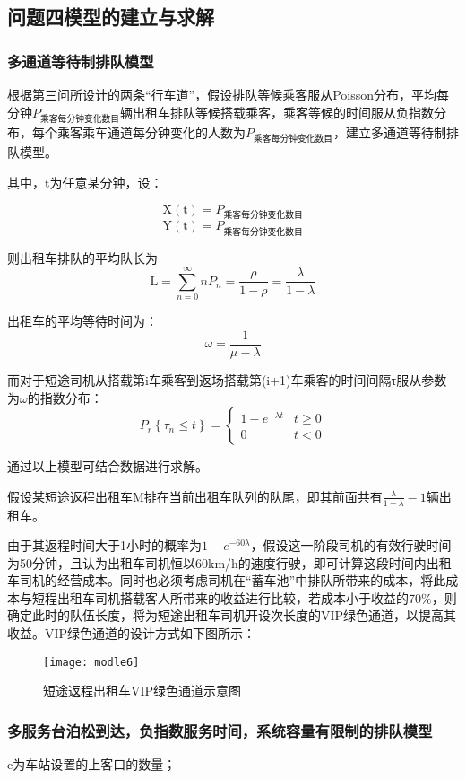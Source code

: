 \documentclass[withoutpreface,bwprint]{cumcmthesis} %
\begin{document}
\subsection{问题四模型的建立与求解}
\subsubsection{多通道等待制排队模型}
根据第三问所设计的两条“行车道”，假设排队等候乘客服从Poisson分布，平均每分钟$P_{\text{乘客每分钟变化数目}}$辆出租车排队等候搭载乘客，乘客等候的时间服从负指数分布，每个乘客乘车通道每分钟变化的人数为$P_{\text{乘客每分钟变化数目}}$，建立多通道等待制排队模型。

其中，t为任意某分钟，设：

$$
\mathrm{X}(\mathrm{t})=P_{\text{乘客每分钟变化数目}}
$$
$$
\mathrm{Y}(\mathrm{t})=P_{\text{乘客每分钟变化数目}}
$$

则出租车排队的平均队长为
$$
\mathrm{L}=\sum_{n=0}^{\infty} n P_{n}=\frac{\rho}{1-\rho}=\frac{\lambda}{1-\lambda}
$$

出租车的平均等待时间为：
$$
\omega=\frac{1}{\mu-\lambda}
$$

而对于短途司机从搭载第i车乘客到返场搭载第(i+1)车乘客的时间间隔τ服从参数为$\omega$的指数分布：
$$
P_{r}\left\{\tau_{n} \leq t\right\}=\left\{\begin{array}{ll}{1-e^{-\lambda t}} & {t \geq 0} \\ {0} & {t<0}\end{array}\right.
$$

通过以上模型可结合数据进行求解。

假设某短途返程出租车M排在当前出租车队列的队尾，即其前面共有$\frac{\lambda}{1-\lambda}-1$辆出租车。

由于其返程时间大于1小时的概率为$1-e^{-60 \lambda}$，假设这一阶段司机的有效行驶时间为50分钟，且认为出租车司机恒以60km/h的速度行驶，即可计算这段时间内出租车司机的经营成本。同时也必须考虑司机在“蓄车池”中排队所带来的成本，将此成本与短程出租车司机搭载客人所带来的收益进行比较，若成本小于收益的70$\%$，则确定此时的队伍长度，将为短途出租车司机开设次长度的VIP绿色通道，以提高其收益。VIP绿色通道的设计方式如下图所示：

\begin{figure}[!h]
	\centering
	\texttt{[image: modle6]}
	\caption{短途返程出租车VIP绿色通道示意图}
	\label{fig:circuit-diagram}
\end{figure}

\subsubsection{多服务台泊松到达，负指数服务时间，系统容量有限制的排队模型}
c为车站设置的上客口的数量；
\end{document}
